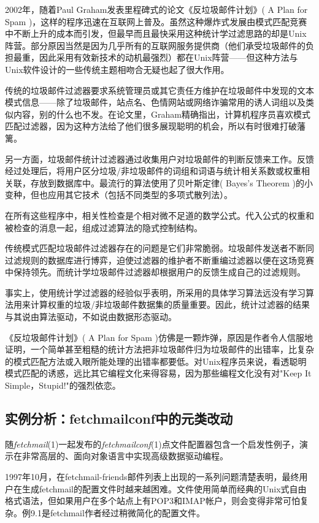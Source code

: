 \documentclass[12pt,oneside]{book}
\begin{document}
\begin{common-format}
2002年，随着Paul Graham发表里程碑式的论文《反垃圾邮件计划》( A Plan for Spam )\cite{Graham}，这样的程序迅速在互联网上普及。虽然这种爆炸式发展由模式匹配竞赛中不断上升的成本而引发，但最早而且最快采用这种统计学过滤思路的却是Unix阵营。部分原因当然是因为几乎所有的互联网服务提供商（他们承受垃圾邮件的负担最重，因此采用有效新技术的动机最强烈）都在Unix阵营——但这种方法与Unix软件设计的一些传统主题相吻合无疑也起了很大作用。

传统的垃圾邮件过滤器要求系统管理员或其它责任方维护在垃圾邮件中发现的文本模式信息——除了垃圾邮件，站点名、色情网站或网络诈骗常用的诱人词组以及类似内容，别的什么也不发。在论文里，Graham精确指出，计算机程序员喜欢模式匹配过滤器，因为这种方法给了他们很多展现聪明的机会，所以有时很难打破藩篱。

另一方面，垃圾邮件统计过滤器通过收集用户对垃圾邮件的判断反馈来工作。反馈经过处理后，将用户区分垃圾/非垃圾邮件的词组和词语与统计相关系数或权重相关联，存放到数据库中。最流行的算法使用了贝叶斯定律( Bayes's Theorem )的小变种，但也应用其它技术（包括不同类型的多项式散列法）。

在所有这些程序中，相关性检查是个相对微不足道的数学公式。代入公式的权重和被检查的消息一起，组成过滤算法的隐式控制结构。

传统模式匹配垃圾邮件过滤器存在的问题是它们非常脆弱。垃圾邮件发送者不断同过滤规则的数据库进行博弈，迫使过滤器的维护者不断重编过滤器以便在这场竞赛中保持领先。而统计学垃圾邮件过滤器却根据用户的反馈生成自己的过滤规则。

事实上，使用统计学过滤器的经验似乎表明，所采用的具体学习算法远没有学习算法用来计算权重的垃圾/非垃圾邮件数据集的质量重要。因此，统计过滤器的结果与其说由算法驱动，不如说由数据形态驱动。

《反垃圾邮件计划》( A Plan for Spam )仿佛是一颗炸弹，原因是作者令人信服地证明，一个简单甚至粗糙的统计方法把非垃圾邮件归为垃圾邮件的出错率，比复杂的模式匹配方法或入眼所能处理的出错率都要低。对Unix程序员来说，看透聪明模式匹配的诱惑，远比其它编程文化来得容易，因为那些编程文化没有对"Keep It Simple，Stupid!"的强烈依恋。

\subsection{实例分析：fetchmailconf中的元类改动}
随\textit{fetchmail}(1)一起发布的\textit{fetchmailconf}(1)点文件配置器包含一个启发性例子，演示在非常高层的、面向对象语言中实现高级数据驱动编程。

1997年10月，在fetchmail-friends邮件列表上出现的一系列问题清楚表明，最终用户在生成fetchmail的配置文件时越来越困难。文件使用简单而经典的Unix式自由格式语法，但如果用户在多个站点上有POP3和IMAP帐户，则会变得非常可怕复杂。例9.1是fetchmail作者经过稍微简化的配置文件。




\end{common-format}
\end{document}
